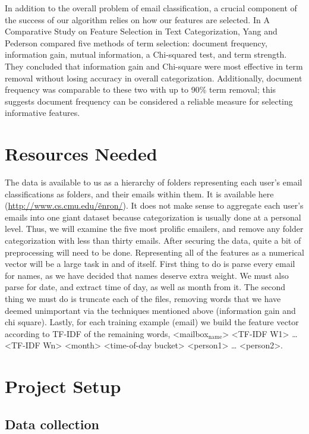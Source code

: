 \documentclass[11pt]{article}
\begin{document}
In addition to the overall problem of email classification, a crucial component of the success of our algorithm relies on how our features are selected.  In A Comparative Study on Feature Selection in Text Categorization, Yang and Pederson compared five methods of term selection: document frequency, information gain, mutual information, a Chi-squared test, and term strength.  They concluded that information gain and Chi-square were most effective in term removal without losing accuracy in overall categorization.  Additionally, document frequency was comparable to these two with up to 90\% term removal; this suggests document frequency can be considered a reliable measure for selecting informative features.
\section{Resources Needed}
\label{sec-3}


The data is available to us as a hierarchy of folders representing each user’s email classifications as folders, and their emails within them. It is available here (\href{http://www.cs.cmu.edu/~enron/}{http://www.cs.cmu.edu/\~enron/}). It does not make sense to aggregate each user’s emails into one giant dataset because categorization is usually done at a personal level. Thus, we will examine the five most prolific emailers, and remove any folder categorization with less than thirty emails.
After securing the data, quite a bit of preprocessing will need to be done. Representing all of the features as a numerical vector will be a large task in and of itself. First thing to do is parse every email for names, as we have decided that names deserve extra weight. We must also parse for date, and extract time of day, as well as month from it. The second thing we must do is truncate each of the files, removing words that we have deemed unimportant via the techniques mentioned above (information gain and chi square). Lastly, for each training example (email) we build the feature vector according to TF-IDF of the remaining words, <mailbox$_{\mathrm{name}}$> <TF-IDF W1> … <TF-IDF Wn> <month> <time-of-day bucket> <person1> … <person2>.
\section{Project Setup}
\label{sec-4}
\subsection{Data collection}
\label{sec-4-1}
\end{document}
